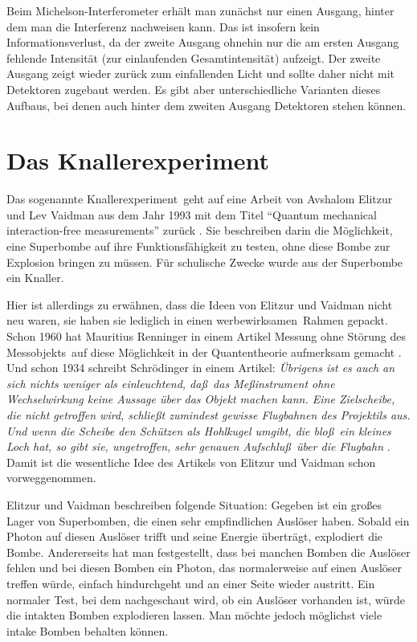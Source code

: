 Beim Michelson-Interferometer erh\"alt man zun\"achst nur einen Ausgang, hinter
dem man die Interferenz nachweisen kann. Das ist insofern kein Informationsverlust,
da der zweite Ausgang ohnehin nur die am ersten Ausgang fehlende Intensit\"at 
(zur einlaufenden Gesamtintensit\"at) aufzeigt. Der zweite Ausgang zeigt wieder zur\"uck
zum einfallenden Licht und sollte daher nicht mit Detektoren zugebaut werden. Es gibt
aber unterschiedliche Varianten dieses Aufbaus, bei denen auch hinter dem zweiten Ausgang
Detektoren stehen k\"onnen.

\section{Das \glqq Knallerexperiment\grqq}

Das sogenannte \glqq Knallerexperiment\grqq\ geht 
auf eine Arbeit von Avshalom Elitzur und
Lev Vaidman aus dem Jahr 1993 mit dem Titel ``Quantum mechanical interaction-free measurements'' 
zur\"uck \cite{Elitzur}.
Sie beschreiben darin die M\"oglichkeit, eine Superbombe auf ihre Funktionsf\"ahigkeit zu testen, ohne
diese Bombe zur Explosion bringen zu m\"ussen. F\"ur schulische Zwecke wurde aus der Superbombe
ein \glqq Knaller\grqq. 

Hier ist allerdings zu erw\"ahnen, dass die Ideen von Elitzur und Vaidman nicht neu waren, sie
haben sie lediglich in einen \glqq werbewirksamen\grqq\ Rahmen gepackt. Schon 1960 hat 
Mauritius Renninger 
in einem Artikel \glqq Messung ohne St\"orung des Messobjekts\grqq\ auf diese
M\"oglichkeit in der Quantentheorie aufmerksam gemacht \cite{Renninger}. Und schon 1934 schreibt 
Schr\"odinger in einem Artikel: \textit{\"Ubrigens ist es auch an sich nichts weniger als einleuchtend,
da\ss\ das Me\ss instrument ohne Wechselwirkung keine Aussage \"uber das Objekt machen kann.
Eine Zielscheibe, die nicht getroffen wird, schlie\ss t zumindest gewisse Flugbahnen des Projektils
aus. Und wenn die Scheibe den Sch\"utzen als Hohlkugel umgibt, die blo\ss\ ein kleines Loch hat,
so gibt sie, ungetroffen, sehr genauen Aufschlu\ss\ \"uber die Flugbahn} \cite{Schroedinger}. Damit
ist die wesentliche Idee des Artikels von Elitzur und Vaidman schon vorweggenommen. 

Elitzur und Vaidman beschreiben folgende Situation: Gegeben ist ein gro\ss es Lager von
Superbomben, die einen sehr empfindlichen Ausl\"oser haben. Sobald ein Photon auf diesen
Ausl\"oser trifft und seine Energie \"ubertr\"agt, 
explodiert die Bombe. Andererseits hat man festgestellt, dass bei manchen
Bomben die Ausl\"oser fehlen und bei diesen Bomben ein Photon, das normalerweise auf einen 
Ausl\"oser treffen w\"urde, einfach hindurchgeht und an einer Seite wieder austritt. Ein normaler
Test, bei dem nachgeschaut wird, ob ein Ausl\"oser vorhanden ist, w\"urde die intakten Bomben 
explodieren lassen. Man m\"ochte jedoch m\"oglichst viele intake Bomben behalten k\"onnen.

